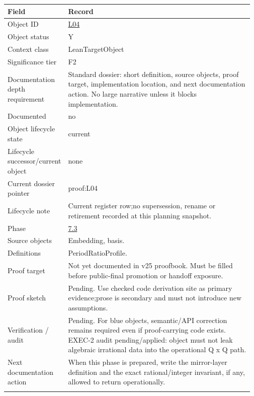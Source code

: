 \begin{longtable}{L{0.16\linewidth} L{0.81\linewidth}}
\hline
\textbf{Field} & \textbf{Record}\\
\hline
Object ID & \hyperlink{object-row-L04}{L04}\\
\hline\addlinespace[0.20em]
Object status & Y\\
\hline\addlinespace[0.20em]
Context class & LeanTargetObject\\
\hline\addlinespace[0.20em]
Significance tier & F2\\
\hline\addlinespace[0.20em]
Documentation depth requirement & Standard dossier: short definition, source objects, proof target, implementation location, and next documentation action. No large narrative unless it blocks implementation.\\
\hline\addlinespace[0.20em]
Documented & no\\
\hline\addlinespace[0.20em]
Object lifecycle state & current\\
\hline\addlinespace[0.20em]
Lifecycle successor/\allowbreak{}current object & none\\
\hline\addlinespace[0.20em]
Current dossier pointer & proof:L04\\
\hline\addlinespace[0.20em]
Lifecycle note & Current register row;\newline no supersession, rename or retirement recorded at this planning snapshot.\\
\hline\addlinespace[0.20em]
Phase & \hyperlink{phase-row-7-3}{7.3}\\
\hline\addlinespace[0.20em]
Source objects & Embedding, basis.\\
\hline\addlinespace[0.20em]
Definitions & PeriodRatioProfile.\\
\hline\addlinespace[0.20em]
Proof target & Not yet documented in v25 proofbook. Must be filled before public-final promotion or handoff exposure.\\
\hline\addlinespace[0.20em]
Proof sketch & Pending. Use checked code derivation site as primary evidence;\newline prose is secondary and must not introduce new assumptions.\\
\hline\addlinespace[0.20em]
Verification /\allowbreak{} audit & Pending. For blue objects, semantic/\allowbreak{}API correction remains required even if proof-carrying code exists. EXEC-2 audit pending/\allowbreak{}applied: object must not leak algebraic irrational data into the operational Q x Q path.\\
\hline\addlinespace[0.20em]
Next documentation action & When this phase is prepared, write the mirror-layer definition and the exact rational/\allowbreak{}integer invariant, if any, allowed to return operationally.\\
\hline\addlinespace[0.20em]
\end{longtable}
